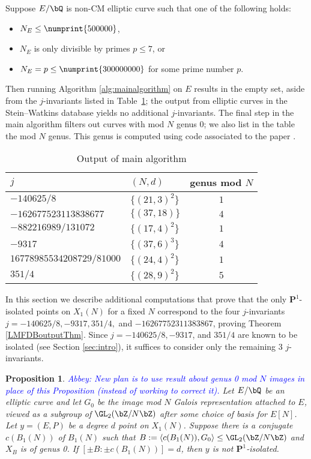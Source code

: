 \documentclass[11pt,reqno]{amsart}
\theoremstyle{plain}
\newtheorem{proposition}[theorem]{Proposition}
\theoremstyle{definition}
\newcommand{\Q}{\bQ}
\newcommand{\Z}{\bZ}
\newcommand{\PP}{\mathbf P}
\newcommand{\abbey}[1]{\textcolor{blue}{Abbey: #1}}
\begin{document}
Suppose $E/\Q$ is non-CM elliptic curve such that one of the following holds:
\begin{itemize}
    \item$N_E \leq \numprint{500000} $,
    \item $N_E$ is only divisible by primes $p \leq 7$, or
    \item $N_E=p \leq \numprint{300000000}$ for some prime number $p$.
\end{itemize} Then running Algorithm \ref{alg:mainalgorithm} on $E$ results in the empty set, aside from the $j$-invariants listed in Table~\ref{table:imagegt0}; the output from elliptic curves in the Stein--Watkins database yields no additional $j$-invariants. The final step in the main algorithm filters out curves with mod $N$ genus $0$; we also list in the table the mod $N$ genus.  This genus is computed using code associated to the paper \cite{RSZB2022}. 
	\begin{table}[h]
	\begin{center}
		\begin{tabularx}{266pt}{l l c} \toprule
		$j$ & $( N, d )$ & genus mod $N$  \\\midrule
$-140625/8$ &  $\{ ( 21, 3 )^2 \} $ & $1$\\
 $-162677523113838677$& $\{ ( 37, 18 ) \}$ & $4$\\
 $-882216989/131072$ & $\{ ( 17, 4 )^2\}$ & $1$ \\
 $-9317$ & $\{ ( 37, 6 )^3 \} $ & $4$\\
 $16778985534208729/81000$ & $\{ ( 24, 4 )^2 \}$ & $1$\\
 $351/4$ & $\{ ( 28, 9 )^2 \}$ & $5$\\ \bottomrule
		\end{tabularx}
		\caption{Output of main algorithm}\label{table:imagegt0}
	\end{center}
\end{table}

In this section we describe additional computations that prove that the only $\PP^1$-isolated points on $X_1(N)$ for a fixed $N$ correspond to the four $j$-invariants $j=-140625/8,-9317,351/4,$ and $ -16267752311383867$, proving Theorem \ref{LMFDBoutputThm}. Since $j=-140625/8,-9317$, and $351/4$ are known to be isolated (see Section \ref{sec:intro}), it suffices to consider only the remaining 3 $j$-invariants.
\begin{proposition} \abbey{New plan is to use result about genus 0 mod $N$ images in place of this Proposition (instead of working to correct it).}
    Let $E/\Q$ be an elliptic curve and let $G_0$ be the image mod $N$ Galois representation attached to $E$, viewed as a subgroup of $\GL_2(\Z/N\Z)$ after some choice of basis for $E[N]$. Let $y=(E,P)$ be a degree $d$ point on $X_1(N)$. Suppose there is a conjugate $c(B_1(N))$ of $B_1(N)$ such that $B:=\langle c(B_1(N)), G_0 \rangle \leq \GL_2(\Z/N\Z)$ and $X_B$ is of genus 0. If $[\pm B: \pm c(B_1(N))]=d$, then $y$ is not $\PP^1$-isolated.
\end{proposition}
\end{document}
